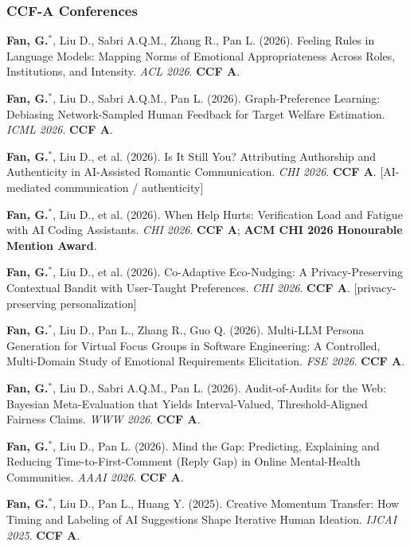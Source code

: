 \documentclass[a4paper,10pt]{article}
\newcommand{\papertag}[1]{\textcolor{cvgray}{\footnotesize\textsf{[#1]}}}
\newcommand{\pubitem}[1]{\item #1}
\begin{document}
\subsubsection*{CCF-A Conferences}
\begin{enumerate}[label=\textbf{[C\arabic*]}]
  \pubitem{\textbf{Fan, G.}$^{*}$, Liu D., Sabri A.Q.M., Zhang R., Pan L. (2026). Feeling Rules in Language Models: Mapping Norms of Emotional Appropriateness Across Roles, Institutions, and Intensity. \textit{ACL 2026}. \textbf{CCF A}.}

  \pubitem{\textbf{Fan, G.}$^{*}$, Liu D., Sabri A.Q.M., Pan L. (2026). Graph-Preference Learning: Debiasing Network-Sampled Human Feedback for Target Welfare Estimation. \textit{ICML 2026}. \textbf{CCF A}.}

  \pubitem{\textbf{Fan, G.}$^{*}$, Liu D., et al. (2026). Is It Still You? Attributing Authorship and Authenticity in AI-Assisted Romantic Communication. \textit{CHI 2026}. \textbf{CCF A}. \papertag{AI-mediated communication / authenticity}}

  \pubitem{\textbf{Fan, G.}$^{*}$, Liu D., et al. (2026). When Help Hurts: Verification Load and Fatigue with AI Coding Assistants. \textit{CHI 2026}. \textbf{CCF A}; \textbf{ACM CHI 2026 Honourable Mention Award}.}

  \pubitem{\textbf{Fan, G.}$^{*}$, Liu D., et al. (2026). Co-Adaptive Eco-Nudging: A Privacy-Preserving Contextual Bandit with User-Taught Preferences. \textit{CHI 2026}. \textbf{CCF A}. \papertag{privacy-preserving personalization}}

  \pubitem{\textbf{Fan, G.}$^{*}$, Liu D., Pan L., Zhang R., Guo Q. (2026). Multi-LLM Persona Generation for Virtual Focus Groups in Software Engineering: A Controlled, Multi-Domain Study of Emotional Requirements Elicitation. \textit{FSE 2026}. \textbf{CCF A}.}

  \pubitem{\textbf{Fan, G.}$^{*}$, Liu D., Sabri A.Q.M., Pan L. (2026). Audit-of-Audits for the Web: Bayesian Meta-Evaluation that Yields Interval-Valued, Threshold-Aligned Fairness Claims. \textit{WWW 2026}. \textbf{CCF A}.}

  \pubitem{\textbf{Fan, G.}$^{*}$, Liu D., Pan L. (2026). Mind the Gap: Predicting, Explaining and Reducing Time-to-First-Comment (Reply Gap) in Online Mental-Health Communities. \textit{AAAI 2026}. \textbf{CCF A}.}

  \pubitem{\textbf{Fan, G.}$^{*}$, Liu D., Pan L., Huang Y. (2025). Creative Momentum Transfer: How Timing and Labeling of AI Suggestions Shape Iterative Human Ideation. \textit{IJCAI 2025}. \textbf{CCF A}.}
\end{enumerate}
\end{document}

